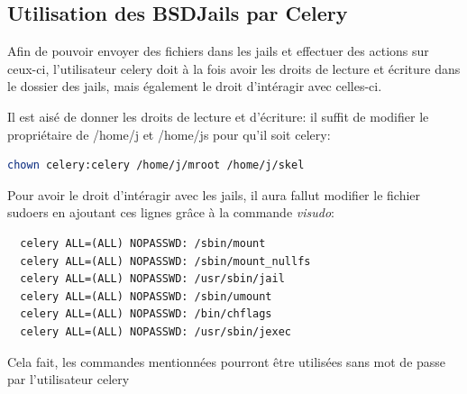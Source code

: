 \documentclass[10pt,a4paper]{article}
\begin{document}
\subsection{Utilisation des BSDJails par Celery}
Afin de pouvoir envoyer des fichiers dans les jails et effectuer des actions sur ceux-ci, l'utilisateur celery doit à la fois avoir les droits de lecture et écriture dans le dossier des jails, mais également le droit d'intéragir avec celles-ci.

Il est aisé de donner les droits de lecture et d'écriture: il suffit de modifier le propriétaire de /home/j et /home/js pour qu'il soit celery:
\begin{lstlisting}[language=bash]
  chown celery:celery /home/j/mroot /home/j/skel
\end{lstlisting}

Pour avoir le droit d'intéragir avec les jails, il aura fallut modifier le fichier sudoers
en ajoutant ces lignes grâce à la commande \emph{visudo}:
\begin{lstlisting}
  celery ALL=(ALL) NOPASSWD: /sbin/mount
  celery ALL=(ALL) NOPASSWD: /sbin/mount_nullfs
  celery ALL=(ALL) NOPASSWD: /usr/sbin/jail
  celery ALL=(ALL) NOPASSWD: /sbin/umount
  celery ALL=(ALL) NOPASSWD: /bin/chflags
  celery ALL=(ALL) NOPASSWD: /usr/sbin/jexec
\end{lstlisting}
Cela fait, les commandes mentionnées pourront être utilisées sans mot de passe par l'utilisateur celery
\end{document}
